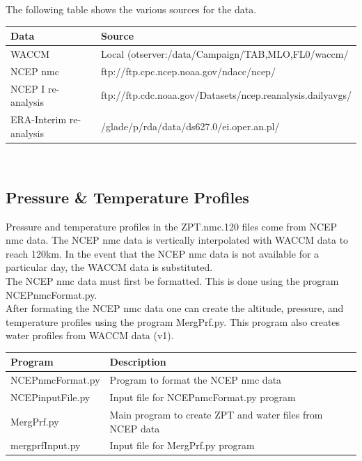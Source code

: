 \documentclass[12pt, letterpaper]{article}
\begin{document}
The following table shows the various sources for the data.\\

\begin{tabular}{ l l }
\textbf{Data} & \textbf{Source} \\
\hline
WACCM              & Local (otserver:/data/Campaign/TAB,MLO,FL0/waccm/  \\
NCEP nmc           & ftp://ftp.cpc.ncep.noaa.gov/ndacc/ncep/\\
NCEP I re-analysis & ftp://ftp.cdc.noaa.gov/Datasets/ncep.reanalysis.dailyavgs/          \\
ERA-Interim re-analysis   & /glade/p/rda/data/ds627.0/ei.oper.an.pl/         \\
\end{tabular} \\


\subsection{Pressure \& Temperature Profiles}
\label{sec:PT}
Pressure and temperature profiles in the ZPT.nmc.120 files come from NCEP nmc data. The NCEP nmc data is vertically interpolated with WACCM data to reach 120km. In the event that the NCEP nmc data is not available for a particular day, the WACCM data is substituted.\\

The NCEP nmc data must first be formatted. This is done using the program NCEPnmcFormat.py.\\

After formating the NCEP nmc data one can create the altitude, pressure, and temperature profiles using the program MergPrf.py. This program also creates water profiles from WACCM data (v1).\\

\begin{tabular}{ l l }
\textbf{Program} & \textbf{Description} \\
\hline
NCEPnmcFormat.py & Program to format the NCEP nmc data\\
NCEPinputFile.py & Input file for NCEPnmcFormat.py program \\
MergPrf.py       & Main program to create ZPT and water files from NCEP data\\
mergprfInput.py  & Input file for MergPrf.py program \\
\end{tabular} \\
\end{document}
